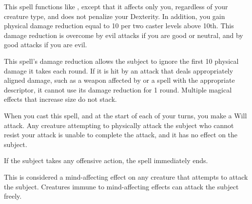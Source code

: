 \begin{spelleffect}
    This spell functions like , except that it affects only you, regardless of your creature type, and does not penalize your Dexterity. In addition, you gain physical damage reduction equal to 10  per two caster levels above 10th. This damage reduction is overcome by evil attacks if you are good or neutral, and by good attacks if you are evil.
\end{spelleffect}
\begin{spellnotes}
    This spell's damage reduction allows the subject to ignore the first 10 physical damage it takes each round. If it is hit by an attack that deals appropriately aligned damage, such as a weapon affected by  or a spell with the appropriate descriptor, it cannot use its damage reduction for 1 round.
    Multiple magical effects that increase size do not stack.
\end{spellnotes}

\spelldur{\durshort}
\begin{spelleffect}
    When you cast this spell, and at the start of each of your turns, you make a Will attack. Any creature attempting to physically attack the subject who cannot resist your attack is unable to complete the attack, and it has no effect on the subject.

    If the subject takes any offensive action, the spell immediately ends.

\end{spelleffect}
\begin{spellnotes}
    This is considered a mind-affecting effect on any creature that attempts to attack the subject. Creatures immune to mind-affecting effects can attack the subject freely.
\end{spellnotes}

\begin{comment}
\subsubsection{S}
\end{comment}

